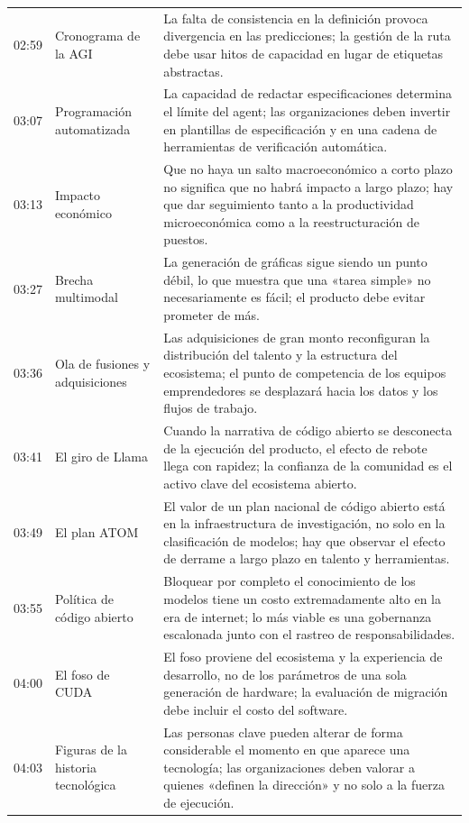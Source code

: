 \documentclass[a4paper]{article}
\begin{document}
\begin{longtable}{p{}p{}p{}}
02:59 & Cronograma de la AGI & La falta de consistencia en la definición provoca divergencia en las predicciones; la gestión de la ruta debe usar hitos de capacidad en lugar de etiquetas abstractas. \\
03:07 & Programación automatizada & La capacidad de redactar especificaciones determina el límite del agent; las organizaciones deben invertir en plantillas de especificación y en una cadena de herramientas de verificación automática. \\
03:13 & Impacto económico & Que no haya un salto macroeconómico a corto plazo no significa que no habrá impacto a largo plazo; hay que dar seguimiento tanto a la productividad microeconómica como a la reestructuración de puestos. \\
03:27 & Brecha multimodal & La generación de gráficas sigue siendo un punto débil, lo que muestra que una «tarea simple» no necesariamente es fácil; el producto debe evitar prometer de más. \\
03:36 & Ola de fusiones y adquisiciones & Las adquisiciones de gran monto reconfiguran la distribución del talento y la estructura del ecosistema; el punto de competencia de los equipos emprendedores se desplazará hacia los datos y los flujos de trabajo. \\
03:41 & El giro de Llama & Cuando la narrativa de código abierto se desconecta de la ejecución del producto, el efecto de rebote llega con rapidez; la confianza de la comunidad es el activo clave del ecosistema abierto. \\
03:49 & El plan ATOM & El valor de un plan nacional de código abierto está en la infraestructura de investigación, no solo en la clasificación de modelos; hay que observar el efecto de derrame a largo plazo en talento y herramientas. \\
03:55 & Política de código abierto & Bloquear por completo el conocimiento de los modelos tiene un costo extremadamente alto en la era de internet; lo más viable es una gobernanza escalonada junto con el rastreo de responsabilidades. \\
04:00 & El foso de CUDA & El foso proviene del ecosistema y la experiencia de desarrollo, no de los parámetros de una sola generación de hardware; la evaluación de migración debe incluir el costo del software. \\
04:03 & Figuras de la historia tecnológica & Las personas clave pueden alterar de forma considerable el momento en que aparece una tecnología; las organizaciones deben valorar a quienes «definen la dirección» y no solo a la fuerza de ejecución. \\

\end{longtable}
\end{document}
